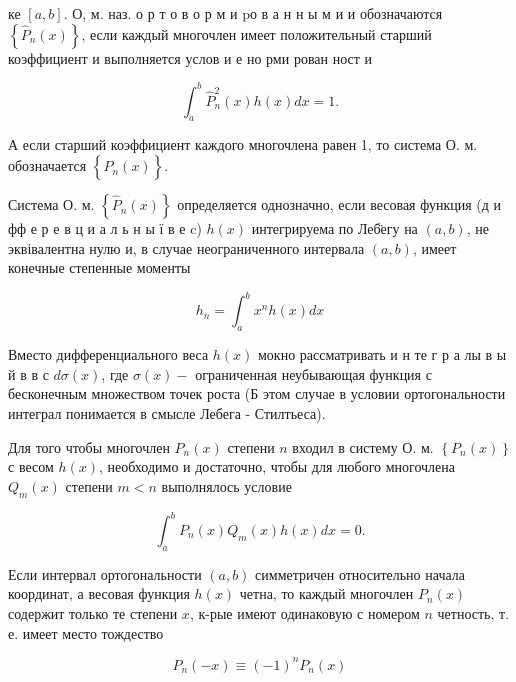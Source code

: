 \documentclass[10pt]{article}
\begin{document}
ке $[a, b]$. О, м. наз. о р т о в о р м и $\mathrm{p} о$ в а н н ы м и и обозначаются $\left\{\hat{P}_{n}(x)\right\}$, если каждый многочлен имеет положительный старший коэффициент и выполняется услов и е но рми рован ност и



\[

\int_{a}^{b} \hat{P}_{n}^{2}(x) h(x) d x=1 .

\]



А если старший коэффициент каждого многочлена равен 1, то система О. м. обозначается $\left\{\hat{P}_{n}(x)\right\}$.



Система О. м. $\left\{\hat{P}_{n}(x)\right\}$ определяется однозначно, если весовая функция (д и фф е р е в ц и а л ь н ы ї в е c) $h(x)$ интегрируема по Леб̈егу на $(a, b)$, не эквівалентна нулю и, в случае неограниченного интервала $(a, b)$, имеет конечные степенные моменты



\[

h_{n}=\int_{a}^{b} x^{n} h(x) d x

\]



Вместо дифференциального веса $h(x)$ мокно рассматривать и н те г р а лы в ы й в в с $d \sigma(x)$, где $\sigma(x)-$ ограниченная неубывающая функция с бесконечным множеством точек роста (Б этом случае в условии ортогональности интеграл понимается в смысле Лебега - Стилтьеса).



Для того чтобы многочлен $P_{n}(x)$ степени $n$ входил в систему О. м. $\left\{P_{n}(x)\right\}$ с весом $h(x)$, необходимо и достаточно, чтобы для любого многочлена $Q_{m}(x)$ степени $m<n$ выполнялось условие



\[

\int_{a}^{b} P_{n}(x) Q_{m}(x) h(x) d x=0 .

\]



Если интервал ортогональности $(a, b)$ симметричен относительно начала координат, а весовая функция $h(x)$ четна, то каждый многочлен $P_{n}(x)$ содержит только те степени $x$, к-рые имеют одинаковую с номером $n$ четность, т. е. имеет место тождество



\[

P_{n}(-x) \equiv(-1)^{n} P_{n}(x)

\]
\end{document}
